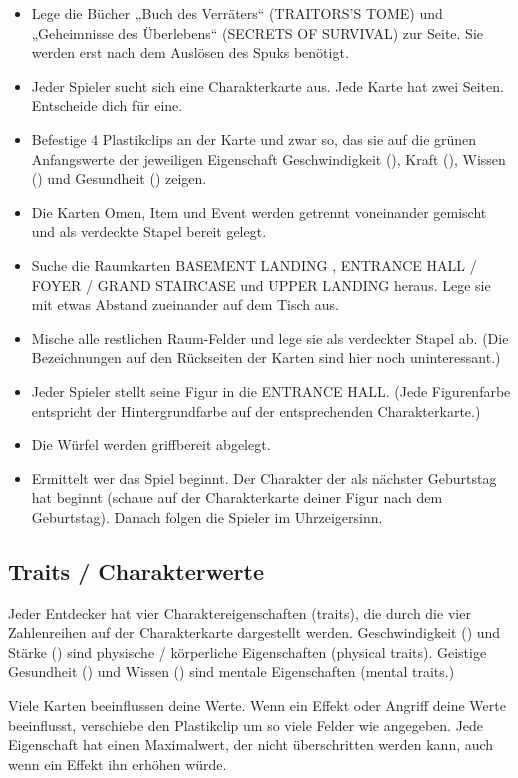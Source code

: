 \begin{itemize}
    \item Lege die Bücher „Buch des Verräters“ (TRAITORS’S TOME) und „Geheimnisse des Überlebens“ (SECRETS OF SURVIVAL) zur Seite. Sie werden erst nach dem Auslösen des Spuks benötigt.
    \item Jeder Spieler sucht sich eine Charakterkarte aus. Jede Karte hat zwei Seiten. Entscheide dich für eine.
    \item Befestige 4 Plastikclips an der Karte und zwar so, das sie auf die grünen Anfangswerte der jeweiligen Eigenschaft Geschwindigkeit (\speed), Kraft (\might), Wissen (\know) und Gesundheit (\sanity) zeigen.
    \item Die Karten Omen, Item und Event werden getrennt voneinander gemischt und als verdeckte Stapel bereit gelegt.
    \item Suche die Raumkarten BASEMENT LANDING , ENTRANCE HALL / FOYER / GRAND STAIRCASE und UPPER LANDING heraus. Lege sie mit etwas Abstand zueinander auf dem Tisch aus.
    \item Mische alle restlichen Raum-Felder und lege sie als verdeckter Stapel ab. (Die Bezeichnungen auf den Rückseiten der Karten sind hier noch uninteressant.)
    \item Jeder Spieler stellt seine Figur in die ENTRANCE HALL. (Jede Figurenfarbe entspricht der Hintergrundfarbe auf der entsprechenden Charakterkarte.)
    \item Die Würfel werden griffbereit abgelegt.
    \item Ermittelt wer das Spiel beginnt. Der Charakter der als nächster Geburtstag hat beginnt (schaue auf der Charakterkarte deiner Figur nach dem Geburtstag). Danach folgen die Spieler im Uhrzeigersinn.
\end{itemize}


\subsection{Traits / Charakterwerte}

Jeder Entdecker hat vier Charaktereigenschaften (traits), die durch die vier Zahlenreihen auf der Charakterkarte dargestellt werden. Geschwindigkeit (\speed) und Stärke (\might) sind physische / körperliche Eigenschaften (physical traits). Geistige Gesundheit (\sanity) und Wissen (\know) sind mentale Eigenschaften (mental traits.)

Viele Karten beeinflussen deine Werte. Wenn ein Effekt oder Angriff deine Werte beeinflusst, verschiebe den Plastikclip um so viele Felder wie angegeben. Jede Eigenschaft hat einen Maximalwert, der nicht überschritten werden kann, auch wenn ein Effekt ihn erhöhen würde.


